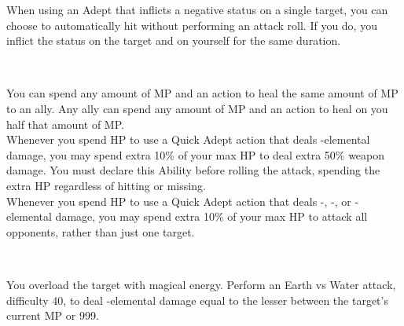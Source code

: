 \begin{tabjob}
         When using an Adept  that inflicts a negative status on a single target, you can choose to automatically hit without performing an attack roll. If you do, you inflict the status on the target and on yourself for the same duration. \\

    \tabjobsep%

    \\
    \tabjobspec{}

         You can spend any amount of MP and an action to heal the same amount of MP to an ally. Any ally can spend any amount of MP and an action to heal on you half that amount of MP\@. \\

         Whenever you spend HP to use a Quick Adept action that deals -elemental damage, you may spend extra 10\% of your max HP to deal extra 50\% weapon damage. You must declare this Ability before rolling the attack, spending the extra HP regardless of hitting or missing. \\

         Whenever you spend HP to use a Quick Adept action that deals -, -, or -elemental damage, you may spend extra 10\% of your max HP to attack all opponents, rather than just one target. \\

    \tabjobsep%

     \\
    \tabjobspec{}

         You overload the target with magical energy. Perform an Earth vs Water attack, difficulty 40, to deal -elemental damage equal to the lesser between the target's current MP or 999. \\


\end{tabjob}
